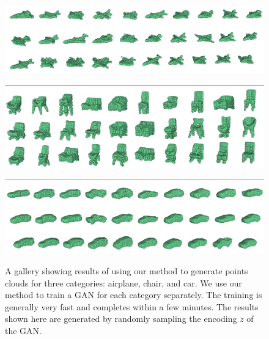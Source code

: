 \begin{figure}[t]
\includegraphics[width=1.0\linewidth]{PCAGAN/images/gallery/airplanes.png}
\includegraphics[width=1.0\linewidth]{PCAGAN/images/hline.png}
\includegraphics[width=1.0\linewidth]{PCAGAN/images/gallery/chairs.png}
\includegraphics[width=1.0\linewidth]{PCAGAN/images/hline.png}
\includegraphics[width=1.0\linewidth]{PCAGAN/images/gallery/cars.png}
\vspace{-16pt}
\caption{\small \label{pca:gallery} A gallery showing results of using our method to generate points clouds for three categories: airplane, chair, and car. We use our method to train a GAN for each category separately. The training is generally very fast and completes within a few minutes. The results shown here are generated by randomly sampling the encoding $z$ of the GAN.}
\vspace{-12pt}
\end{figure}



